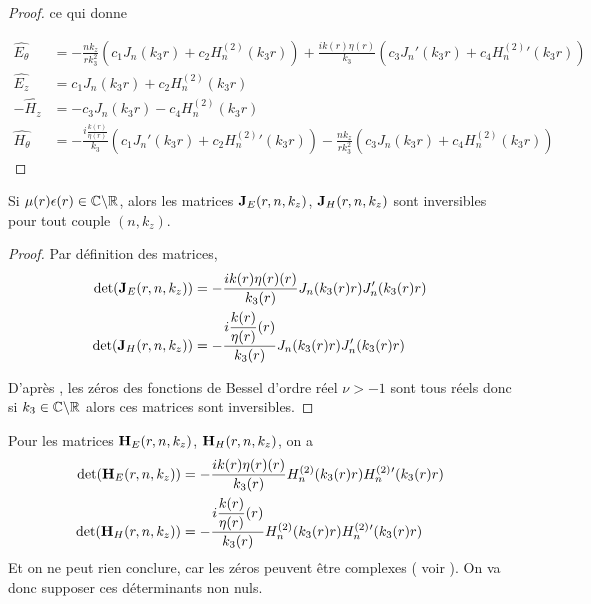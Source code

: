 \begin{proof}
      ce qui donne

       \begin{align*}
        \hat{E_\theta} &= -\frac{nk_z}{rk_3^2}\left(c_1J_n(k_3r) + c_2 H_n^{(2)}(k_3r)\right) + \frac{ik(r)\eta(r)}{k_3}\left(c_3J_n'(k_3r) + c_4 H_n^{(2)}{}'(k_3r)\right)
        \\
        \hat{E_z} &= c_1 J_n(k_3 r) + c_2 H_n^{(2)}(k_3 r)
        \\
        -\hat{H_z} &= -c_3 J_n(k_3 r) - c_4 H_n^{(2)}(k_3 r)
        \\
        \hat{H_\theta} &= -\frac{i\frac{k(r)}{\eta(r)}}{k_3}\left(c_1J_n'(k_3r) + c_2 H_n^{(2)}{}'(k_3r)\right) - \frac{nk_z}{rk_3^2}\left(c_3J_n(k_3r) + c_4 H_n^{(2)}(k_3r)\right)
      \end{align*}
    \end{proof}

    \begin{prop}
      \label{lem:cylindre:imp:inv_matrices_JE-HE}
      Si \(\mu(r)\epsilon(r) \in \mathbb C\backslash\mathbb R\), alors les matrices \(\mathbf{J}_E(r,n,k_z)\), \(\mathbf{J}_H(r,n,k_z)\)  sont inversibles pour tout couple \((n,k_z)\).
    \end{prop}

    \begin{proof}
      Par définition des matrices,
      \begin{align*}
        \det(\mathbf{J}_E(r,n,k_z)) &= -\dfrac{ik(r)\eta(r)(r)}{k_3(r)}J_n(k_3(r)r)J_n'(k_3(r)r)
        \\
        \det(\mathbf{J}_H(r,n,k_z)) &= -\dfrac{i\dfrac{k(r)}{\eta(r)}(r)}{k_3(r)}J_n(k_3(r)r)J_n'(k_3(r)r)
      \end{align*}

      D’après \cite[p.~370]{abramowitz_handbook_1964}, les zéros des fonctions de Bessel d'ordre réel \(\nu >-1\) sont tous réels donc si \(k_3 \in\mathbb C\backslash\mathbb R\) alors ces matrices sont inversibles.
    \end{proof}


    Pour les matrices \(\mathbf{H}_E(r,n,k_z)\), \(\mathbf{H}_H(r,n,k_z)\), on a
    \begin{align*}
      \det(\mathbf{H}_E(r,n,k_z)) &= -\dfrac{ik(r)\eta(r)(r)}{k_3(r)}H_n^{(2)}(k_3(r)r)H_n^{(2)}{}'(k_3(r)r)
      \\
      \det(\mathbf{H}_H(r,n,k_z)) &= -\dfrac{i\dfrac{k(r)}{\eta(r)}(r)}{k_3(r)}H_n^{(2)}(k_3(r)r)H_n^{(2)}{}'(k_3(r)r)
     \end{align*}
    Et on ne peut rien conclure, car les zéros peuvent être complexes ( voir \cite{sandstrom_note_2007} ). On va donc supposer ces déterminants non nuls.


